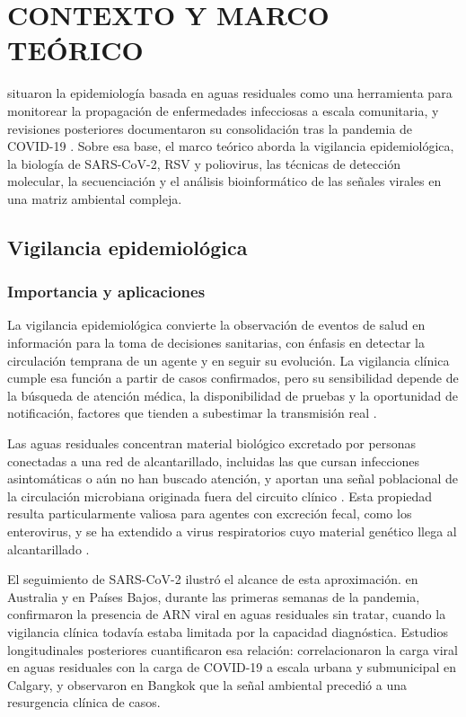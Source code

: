 \section{CONTEXTO Y MARCO TEÓRICO}

 situaron la epidemiología basada en aguas residuales como una herramienta para monitorear la propagación de enfermedades infecciosas a escala comunitaria, y revisiones posteriores documentaron su consolidación tras la pandemia de COVID-19 \cite{Parkins_2023}. Sobre esa base, el marco teórico aborda la vigilancia epidemiológica, la biología de SARS-CoV-2, RSV y poliovirus, las técnicas de detección molecular, la secuenciación y el análisis bioinformático de las señales virales en una matriz ambiental compleja.

\subsection{Vigilancia epidemiológica}

\subsubsection{Importancia y aplicaciones}

La vigilancia epidemiológica convierte la observación de eventos de salud en información para la toma de decisiones sanitarias, con énfasis en detectar la circulación temprana de un agente y en seguir su evolución. La vigilancia clínica cumple esa función a partir de casos confirmados, pero su sensibilidad depende de la búsqueda de atención médica, la disponibilidad de pruebas y la oportunidad de notificación, factores que tienden a subestimar la transmisión real \cite{Parkins_2023}.

Las aguas residuales concentran material biológico excretado por personas conectadas a una red de alcantarillado, incluidas las que cursan infecciones asintomáticas o aún no han buscado atención, y aportan una señal poblacional de la circulación microbiana originada fuera del circuito clínico \cite{Sims_2020}. Esta propiedad resulta particularmente valiosa para agentes con excreción fecal, como los enterovirus, y se ha extendido a virus respiratorios cuyo material genético llega al alcantarillado \cite{Parkins_2023}.

El seguimiento de SARS-CoV-2 ilustró el alcance de esta aproximación.  en Australia y  en Países Bajos, durante las primeras semanas de la pandemia, confirmaron la presencia de ARN viral en aguas residuales sin tratar, cuando la vigilancia clínica todavía estaba limitada por la capacidad diagnóstica. Estudios longitudinales posteriores cuantificaron esa relación:  correlacionaron la carga viral en aguas residuales con la carga de COVID-19 a escala urbana y submunicipal en Calgary, y  observaron en Bangkok que la señal ambiental precedió a una resurgencia clínica de casos.

